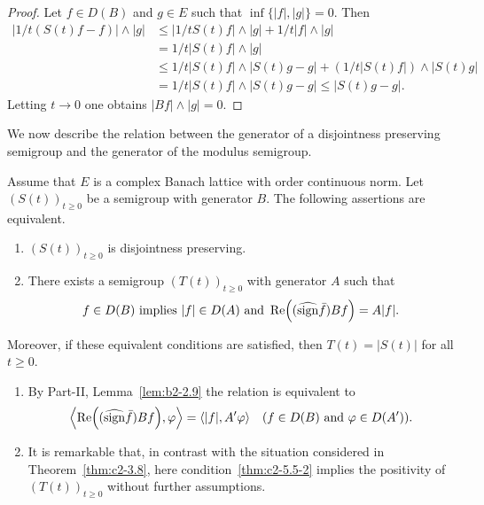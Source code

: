 \begin{proof}
Let $f \in D(B)$ and $g \in E$ such that $\inf\{|f|,|g|\} = 0$. 
Then
\begin{align*}
|1/t(S(t)f - f)| \wedge |g| &\leq |1/tS(t)f| \wedge |g| + 1/t|f| \wedge |g|\\
&= 1/t |S(t)f| \wedge |g|\\
&\leq 1/t |S(t)f| \wedge |S(t)g -g| + (1/t|S(t)f|) \wedge |S(t)g|\\
&= 1/t |S(t)f| \wedge |S(t)g - g|
\leq |S(t)g - g|.
\end{align*}
Letting $t \to 0$ one obtains $|Bf| \wedge |g| = 0$. %
\end{proof}
We now describe the relation between the generator of a disjointness preserving semigroup and the generator of the modulus semigroup.
\begin{theorem}\label{thm:c2-5.5}
Assume that $E$ is a complex Banach lattice with order continuous norm. 
Let $(S(t))_{t \geq 0}$ be a semigroup with generator $B$.
The following assertions are equivalent.
\begin{enumerate}[\upshape (a)]
\item \label{thm:c2-5.5-1}
$(S(t))_{t \geq 0}$ is disjointness preserving.
\item \label{thm:c2-5.5-2}
There exists a semigroup $(T(t))_{t \geq 0}$ with generator $A$ such
that
\begin{equation}\label{eq:c2-5.5}
f \in D(B) \text{ implies } |f| \in D(A) \text{ and } \Re\mleft((\widehat{\sign}  \bar{f})Bf\mright) = A|f|.
\end{equation}
\end{enumerate}
Moreover, if these equivalent conditions are satisfied, then
$T(t) = |S(t)|$ for all $t \geq 0$.
\end{theorem}
\begin{remark*} 
\begin{enumerate}[\upshape (i), wide, labelindent=.25em] %
\item  \label{enum:c2-kgk.1-1} %
By Part-II, Lemma~\ref{lem:b2-2.9} the relation  is equivalent to
\[
\mleft\langle\Re\mleft(( \widehat{\sign}  \bar{f})Bf\mright),\phi \mright\rangle = \langle|f|,A'\phi\rangle \quad (f \in D(B) \text { and }  \phi \in D(A')).
\]
\item \label{enum:c2-kgk.1-2}
It is remarkable that, in contrast with the situation considered in
Theorem~\ref{thm:c2-3.8}, here condition~\ref{thm:c2-5.5-2}  implies the positivity of\/ $(T(t))_{t \geq 0}$
without further assumptions.
\end{enumerate}
\end{remark*}
